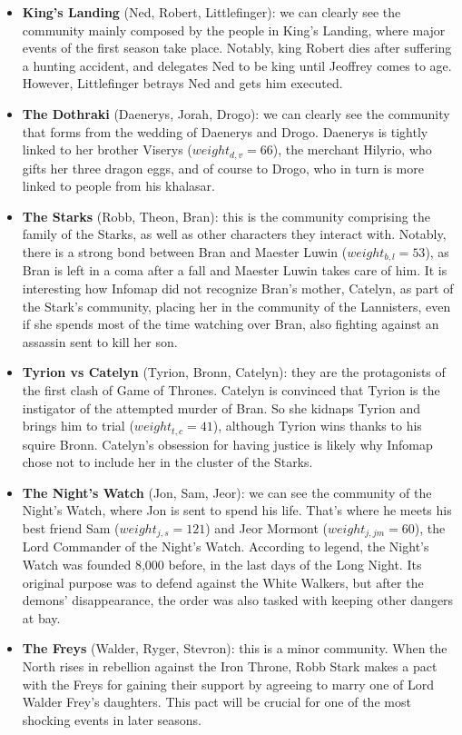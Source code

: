 \documentclass[10pt,twocolumn,letterpaper]{article}
\begin{document}
\begin{itemize}
    \item \textbf{King's Landing} (Ned, Robert, Littlefinger): we can clearly see the community mainly composed by the people in King's Landing, where major events of the first season take place. Notably, king Robert dies after suffering a hunting accident, and delegates Ned to be king until Jeoffrey comes to age. However, Littlefinger betrays Ned and gets him executed. 
    \item \textbf{The Dothraki} (Daenerys, Jorah, Drogo): we can clearly see the community that forms from the wedding of Daenerys and Drogo. Daenerys is tightly linked to her brother Viserys ($weight_{d,v}=66$), the merchant Hilyrio, who gifts her three dragon eggs, and of course to Drogo, who in turn is more linked to people from his khalasar.
    \item \textbf{The Starks} (Robb, Theon, Bran): this is the community comprising the family of the Starks, as well as other characters they interact with. Notably, there is a strong bond between Bran and Maester Luwin ($weight_{b,l}=53$), as Bran is left in a coma after a fall and Maester Luwin takes care of him. It is interesting how Infomap did not recognize Bran's mother, Catelyn, as part of the Stark's community, placing her in the community of the Lannisters, even if she spends most of the time watching over Bran, also fighting against an assassin sent to kill her son.
    \item \textbf{Tyrion vs Catelyn} (Tyrion, Bronn, Catelyn): they are the protagonists of the first clash of Game of Thrones. Catelyn is convinced that Tyrion is the instigator of the attempted murder of Bran. So she kidnaps Tyrion and brings him to trial ($weight_{t,c}=41$), although Tyrion wins thanks to his squire Bronn. Catelyn's obsession for having justice is likely why Infomap chose not to include her in the cluster of the Starks. 
    \item \textbf{The Night's Watch} (Jon, Sam, Jeor): we can see the community of the Night's Watch, where Jon is sent to spend his life. That's where he meets his best friend Sam ($weight_{j,s}=121$) and Jeor Mormont ($weight_{j,jm}=60$), the Lord Commander of the Night's Watch. According to legend, the Night's Watch was founded 8,000 before, in the last days of the Long Night. Its original purpose was to defend against the White Walkers, but after the demons' disappearance, the order was also tasked with keeping other dangers at bay.
    \item \textbf{The Freys} (Walder, Ryger, Stevron): this is a minor community. When the North rises in rebellion against the Iron Throne, Robb Stark makes a pact with the Freys for gaining their support by agreeing to marry one of Lord Walder Frey's daughters. This pact will be crucial for one of the most shocking events in later seasons.

\end{itemize}
\end{document}
